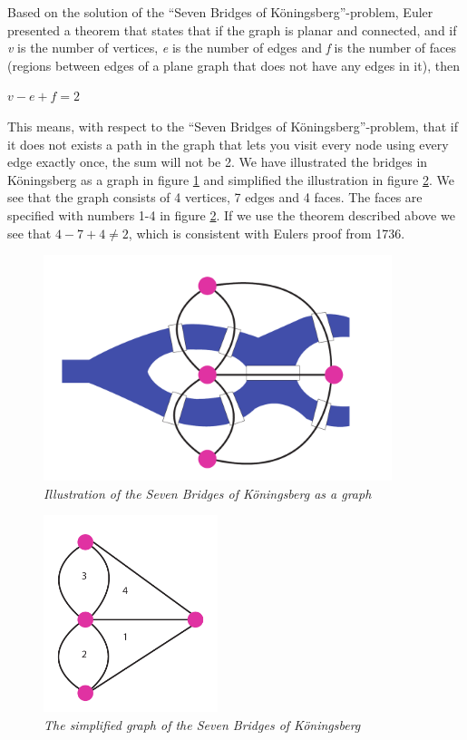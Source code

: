 Based on the solution of the ``Seven Bridges of Köningsberg''-problem, Euler presented a theorem that states that if the graph is planar and connected, and if \textit{v} is the number of vertices, \textit{e} is the number of edges and \textit{f} is the number of faces (regions between edges of a plane graph that does not have any edges in it), then 
\newline
\newline
\centerline{$v-e+f=2$}
\newline
\newline
This means, with respect to the ``Seven Bridges of Köningsberg''-problem, that if it does not exists a path in the graph that lets you visit every node using every edge exactly once, the sum will not be 2. We have illustrated the bridges in Köningsberg as a graph in figure \ref{fig:7bridgesIllustration} and simplified the illustration in figure \ref{fig:7bridgesSimplification}. We see that the graph consists of 4 vertices, 7 edges and 4 faces. The faces are specified with numbers 1-4 in figure \ref{fig:7bridgesSimplification}. If we use the theorem described above we see that $4-7+4\neq2$, which is consistent with Eulers proof from 1736. 

\begin{figure}[H]
  \centering
  \includegraphics[width=4in]{assets/7bridges.pdf}
  \caption{\textit{Illustration of the Seven Bridges of Köningsberg as a graph}}
  \label{fig:7bridgesIllustration}
\end{figure}

\begin{figure}[H]
  \centering
  \includegraphics[width=2in]{assets/7bridges2.pdf}
  \caption{\textit{The simplified graph of the Seven Bridges of Köningsberg}} 
  \label{fig:7bridgesSimplification}
\end{figure}

